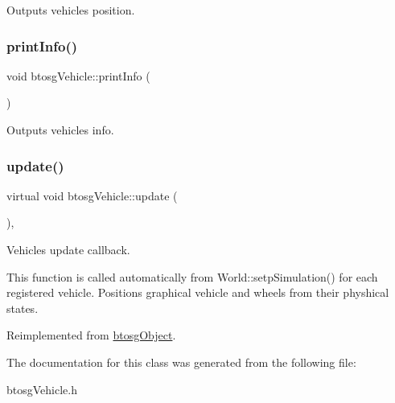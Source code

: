 Outputs vehicle\textquotesingle{}s position. \mbox{\label{classbtosgVehicle_abe98f64f0a8f37c7c0b244e3afbbcb15}} 
\subsubsection{\texorpdfstring{print\+Info()}{printInfo()}}
{\footnotesize\ttfamily void btosg\+Vehicle\+::print\+Info (\begin{DoxyParamCaption}{ }\end{DoxyParamCaption})\hspace{0.3cm}{\ttfamily [inline]}}

Outputs vehicle\textquotesingle{}s info. \mbox{\label{classbtosgVehicle_a5fd0f471df492ac232c9b772a28bd2b9}} 
\subsubsection{\texorpdfstring{update()}{update()}}
{\footnotesize\ttfamily virtual void btosg\+Vehicle\+::update (\begin{DoxyParamCaption}{ }\end{DoxyParamCaption})\hspace{0.3cm}{\ttfamily [inline]}, {\ttfamily [virtual]}}

Vehicle\textquotesingle{}s update callback.

This function is called automatically from World\+::setp\+Simulation() for each registered vehicle. Positions graphical vehicle and wheels from their physhical states. 

Reimplemented from \hyperlink{classbtosgObject_a342917817dfde62554f83da8e0d5110b}{btosg\+Object}.



The documentation for this class was generated from the following file\+:\begin{DoxyCompactItemize}
\item 
btosg\+Vehicle.\+h\end{DoxyCompactItemize}
